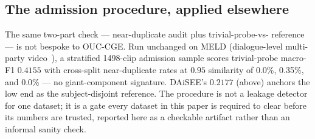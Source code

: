 \subsection{The admission procedure, applied elsewhere}
The same two-part check --- near-duplicate audit plus trivial-probe-vs-
reference --- is not bespoke to OUC-CGE. Run unchanged on MELD
(dialogue-level multi-party video~\cite{poria2019meld}), a stratified
1498-clip admission sample scores trivial-probe macro-F1 $0.4155$ with
cross-split near-duplicate rates at $0.95$ similarity of
0.0\%, 0.35\%, and 0.0\% --- no giant-component signature. DAiSEE's
$0.2177$ (above) anchors the low end as the subject-disjoint reference.
The procedure is not a leakage detector for one dataset; it is a gate every
dataset in this paper is required to clear before its numbers are trusted,
reported here as a checkable artifact rather than an informal sanity check.
